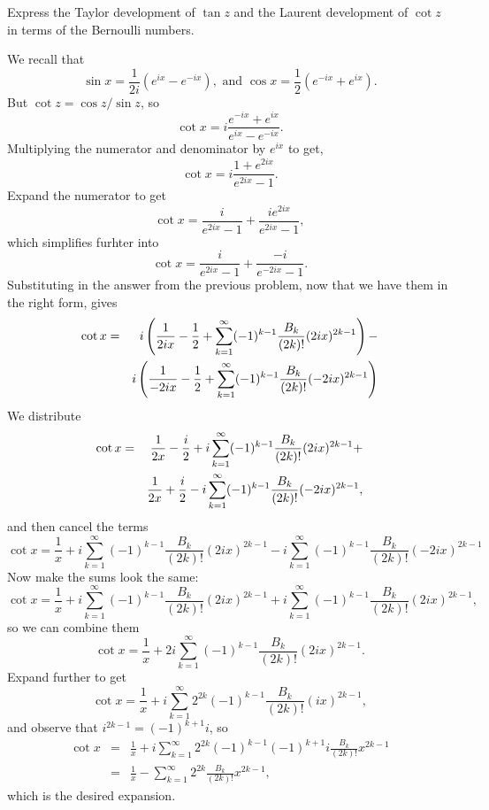 \documentclass{article}
\begin{document}
Express the Taylor development of $\tan z$ and the Laurent development of $\cot z$ in terms of the Bernoulli numbers.

We recall that
$$ \sin x = \frac{1}{2i} (e^{ix} - e^{-ix}), \mbox{ and } \cos x = \frac{1}{2} (e^{-ix} + e^{ix}). $$
But $\cot z = \cos z / \sin z$, so
$$ \cot x = i \frac{e^{-ix} + e^{ix}}{e^{ix} - e^{-ix}}. $$
Multiplying the numerator and denominator by $e^{ix}$ to get,
$$ \cot x = i \frac{1 + e^{2ix}}{e^{2ix} - 1}. $$
Expand the numerator to get
$$ \cot x = \frac{i}{e^{2ix} - 1} + \frac{ie^{2ix}}{e^{2ix} - 1}, $$
which simplifies furhter into
$$ \cot x = \frac{i}{e^{2ix} - 1} + \frac{-i}{e^{-2ix} - 1}. $$
Substituting in the answer from the previous problem, now that we have them in the right form, gives
\begin{eqnarray*}
\cot x &=& i\left(\frac{1}{2ix} - \frac{1}{2} + \sum_{k=1}^\infty (-1)^{k-1} \frac{B_k}{(2k)!} (2ix)^{2k-1}\right) - \\ &\null&  i\left(\frac{1}{-2ix} - \frac{1}{2} + \sum_{k=1}^\infty (-1)^{k-1} \frac{B_k}{(2k)!} (-2ix)^{2k-1}\right)
\end{eqnarray*}
We distribute
\begin{eqnarray*}
\cot x &=& \frac{1}{2x} - \frac{i}{2} + i \sum_{k=1}^\infty (-1)^{k-1} \frac{B_k}{(2k)!} (2ix)^{2k-1} + \\ &\null& \frac{1}{2x} + \frac{i}{2} - i \sum_{k=1}^\infty (-1)^{k-1} \frac{B_k}{(2k)!} (-2ix)^{2k-1},
\end{eqnarray*}
and then cancel the terms
$$
\cot x = \frac{1}{x} + i \sum_{k=1}^\infty (-1)^{k-1} \frac{B_k}{(2k)!} (2ix)^{2k-1} - i \sum_{k=1}^\infty (-1)^{k-1} \frac{B_k}{(2k)!} (-2ix)^{2k-1}
$$
Now make the sums look the same:
$$
\cot x = \frac{1}{x} + i \sum_{k=1}^\infty (-1)^{k-1} \frac{B_k}{(2k)!} (2ix)^{2k-1} + i \sum_{k=1}^\infty (-1)^{k-1} \frac{B_k}{(2k)!} (2ix)^{2k-1},
$$
so we can combine them
$$
\cot x = \frac{1}{x} + 2i \sum_{k=1}^\infty (-1)^{k-1} \frac{B_k}{(2k)!} (2ix)^{2k-1}.
$$
Expand further to get
$$
\cot x = \frac{1}{x} + i \sum_{k=1}^\infty 2^{2k} (-1)^{k-1} \frac{B_k}{(2k)!} (ix)^{2k-1},
$$
and observe that $i^{2k-1} = (-1)^{k+1} i$, so
\begin{eqnarray*}
\cot x &=& \frac{1}{x} + i \sum_{k=1}^\infty 2^{2k} (-1)^{k-1} (-1)^{k+1} i \frac{B_k}{(2k)!} x^{2k-1} \\
&=& \frac{1}{x} - \sum_{k=1}^\infty 2^{2k} \frac{B_k}{(2k)!} x^{2k-1},
\end{eqnarray*}
which is the desired expansion.
\end{document}
